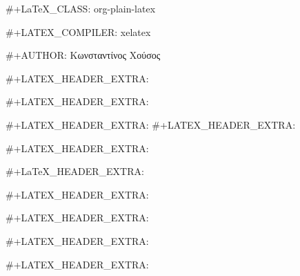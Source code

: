#+LaTeX_CLASS: org-plain-latex

#+LATEX_COMPILER: xelatex

#+AUTHOR: Κωνσταντίνος Χούσος

#+LATEX_HEADER_EXTRA: \usepackage{xltxtra}
#+LATEX_HEADER_EXTRA: \usepackage{xgreek}
#+LATEX_HEADER_EXTRA: 
#+LATEX_HEADER_EXTRA: \usepackage{microtype}

#+LATEX_HEADER_EXTRA: \usepackage{minted}
#+LaTeX_HEADER_EXTRA: 

#+LATEX_HEADER_EXTRA: \usepackage[margin=1.3in]{geometry}

#+LATEX_HEADER_EXTRA: \renewcommand{\baselinestretch}{1.2}

#+LATEX_HEADER_EXTRA: \usepackage[colorlinks]{hyperref}
#+LATEX_HEADER_EXTRA: \hypersetup{colorlinks, linkcolor=blue, urlcolor=blue}


